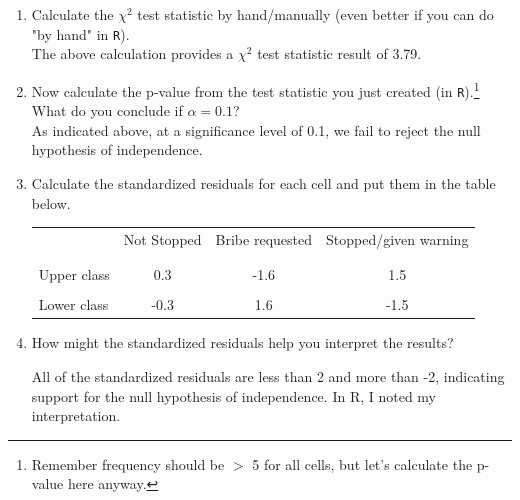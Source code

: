 \documentclass[12pt,letterpaper]{article}
\begin{document}
\begin{enumerate}
	
	\item [(a)]
	Calculate the $\chi^2$ test statistic by hand/manually (even better if you can do "by hand" in \texttt{R}).\\
	  
	
	The above calculation provides a $\chi^2$ test statistic result of 3.79. 
	
	\vspace{1cm}
	
	\item [(b)]
	Now calculate the p-value from the test statistic you just created (in \texttt{R}).\footnote{Remember frequency should be $>$ 5 for all cells, but let's calculate the p-value here anyway.}  What do you conclude if $\alpha = 0.1$?\\
	
		 
		As indicated above, at a significance level of 0.1, we fail to reject the null hypothesis of independence.
		
	\newpage
	\item [(c)] Calculate the standardized residuals for each cell and put them in the table below.
	\vspace{1cm}
	
	\begin{table}[h]
		\centering
		\begin{tabular}{l | c c c }
			& Not Stopped & Bribe requested & Stopped/given warning \\
			\\[-1.8ex] 
			\hline \\[-1.8ex]
			Upper class  & 0.3  & -1.6 & 1.5 \\
			\\
			Lower class &-0.3  &  1.6 &  -1.5 \\
			
		\end{tabular}
	\end{table}
	
		
		
		
	\vspace{1cm}
	\item [(d)] How might the standardized residuals help you interpret the results?  
	
	All of the standardized residuals are less than 2 and more than -2, indicating support for the null hypothesis of independence. In R, I noted my interpretation.
		
		
\end{enumerate}
\newpage
\end{document}
